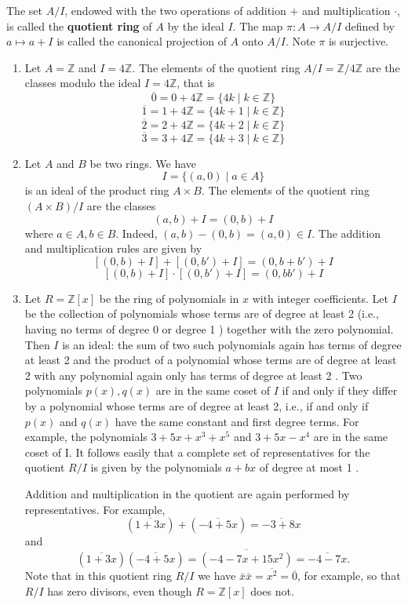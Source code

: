 \documentclass[11pt,a4paper]{article}
\begin{document}
The set \( A / I \), endowed with the two operations of addition \(+\) and multiplication \(\cdot\), is called the \textbf{quotient ring} of \( A \) by the ideal \( I \).
The map \(\pi \colon A\to A/I\) defined by \(a\mapsto a+I\) is called the canonical projection of \(A\) onto \(A/I\).
Note \(\pi\) is surjective.

\begin{exa}
\begin{enumerate}[label=(\roman*)]
\item Let \( A = \mathbb{Z} \) and \( I = 4\mathbb{Z} \). The elements of the quotient ring \( A / I = \mathbb{Z} / 4\mathbb{Z} \)
are the classes modulo the ideal \( I = 4\mathbb{Z} \), that is
\[
\overline{0} = 0 + 4\mathbb{Z} = \{4k \mid k \in \mathbb{Z}\}
\]
\[
\overline{1} = 1 + 4\mathbb{Z} = \{4k + 1 \mid k \in \mathbb{Z}\}
\]
\[
\overline{2} = 2 + 4\mathbb{Z} = \{4k + 2 \mid k \in \mathbb{Z}\}
\]
\[
\overline{3} = 3 + 4\mathbb{Z} = \{4k + 3 \mid k \in \mathbb{Z}\}
\]
\item Let \( A \) and \( B \) be two rings. We have 
\[
I = \{(a, 0) \mid a \in A\}
\]
is an ideal of the product ring \( A \times B \). The elements of the quotient ring \( (A \times B)/I \) are the classes
\[
(a, b) + I = (0, b) + I
\]
where \( a \in A, b \in B \). Indeed, \( (a, b) - (0, b) = (a, 0) \in I \). The addition and multiplication rules are given by
\[
[(0, b) + I] + [(0, b') + I] = (0, b + b') + I
\]
\[
[(0, b) + I] \cdot [(0, b') + I] = (0, bb') + I
\]

\item Let $R=\mathbb{Z}[x]$ be the ring of polynomials in $x$ with integer coefficients. Let $I$ be the collection of polynomials whose terms are of degree at least 2 (i.e., having no terms of degree 0 or degree 1 ) together with the zero polynomial. Then $I$ is an ideal: the sum of two such polynomials again has terms of degree at least 2 and the product of a polynomial whose terms are of degree at least 2 with any polynomial again only has terms of degree at least 2 . Two polynomials $p(x), q(x)$ are in the same coset of $I$ if and only if they differ by a polynomial whose terms are of degree at least 2, i.e., if and only if $p(x)$ and $q(x)$ have the same constant and first degree terms. For example, the polynomials $3+5 x+x^3+x^5$ and $3+5 x-x^4$ are in the same coset of I. It follows easily that a complete set of representatives for the quotient $R / I$ is given by the polynomials $a+b x$ of degree at most 1 .

Addition and multiplication in the quotient are again performed by representatives.
For example,
\[
(\overline{1+3 x})+(\overline{-4+5 x})=\overline{-3+8 x}
\]
and
\[
(\overline{1+3 x})(\overline{-4+5 x})=\overline{\left(-4-7 x+15 x^2\right)}=\overline{-4-7 x} .
\]
Note that in this quotient ring $R / I$ we have $\bar{x} \bar{x}=\overline{x^2}=\overline{0}$, for example, so that $R / I$ has zero divisors, even though $R=\mathbb{Z}[x]$ does not. 


\end{enumerate}
\end{exa}
\end{document}
